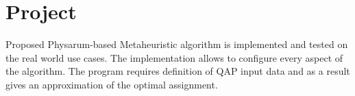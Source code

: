 \chapter{Project}
\label{chapter:project}

Proposed Physarum-based Metaheuristic algorithm is implemented and tested on the real world use cases. The implementation allows to configure every aspect of the algorithm. The program requires definition of QAP input data and as a result gives an approximation of the optimal assignment.





